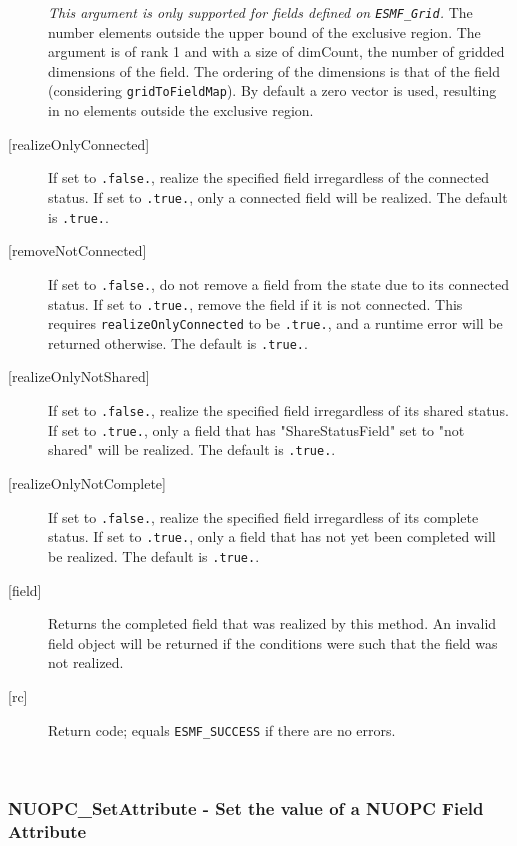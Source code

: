 \begin{description}
       {\em This argument is only supported for fields defined on
       {\tt ESMF\_Grid}.}
       The number elements outside the upper bound of the exclusive region.
       The argument is of rank 1 and with a size of dimCount, the number of
       gridded dimensions of the field. The ordering of the dimensions is that
       of the field (considering {\tt gridToFieldMap}).
       By default a zero vector is used, resulting in no elements outside the
       exclusive region.
     \item[{[realizeOnlyConnected]}]
       If set to {\tt .false.}, realize the specified field irregardless of the
       connected status. If set to {\tt .true.}, only a connected field will be
       realized. The default is {\tt .true.}.
     \item[{[removeNotConnected]}]
       If set to {\tt .false.}, do not remove a field from the state due to its
       connected status. If set to {\tt .true.}, remove the field if it is not
       connected. This requires {\tt realizeOnlyConnected} to be {\tt .true.},
       and a runtime error will be returned otherwise.
       The default is {\tt .true.}.
     \item[{[realizeOnlyNotShared]}]
       If set to {\tt .false.}, realize the specified field irregardless of its
       shared status. If set to {\tt .true.}, only a field that has 
       "ShareStatusField" set to "not shared" will be realized.
       The default is {\tt .true.}.
     \item[{[realizeOnlyNotComplete]}]
       If set to {\tt .false.}, realize the specified field irregardless of its
       complete status. If set to {\tt .true.}, only a field that has not yet
       been completed will be realized.
       The default is {\tt .true.}.
     \item[{[field]}]
       Returns the completed field that was realized by this method. An invalid
       field object will be returned if the conditions were such that the field
       was  not realized.
     \item[{[rc]}]
       Return code; equals {\tt ESMF\_SUCCESS} if there are no errors.
     \end{description}
   
 
\mbox{}\hrulefill\ 
 
\subsubsection [NUOPC\_SetAttribute] {NUOPC\_SetAttribute - Set the value of a NUOPC Field Attribute}


